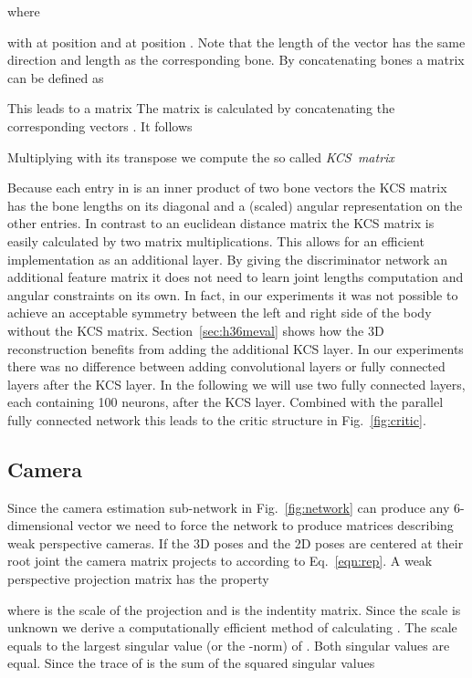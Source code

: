 \documentclass[10pt,twocolumn,letterpaper]{article}
\begin{document}
where

with  at position  and  at position . 
Note that the length of the vector  has the same direction and length as the corresponding bone. 
By concatenating  bones a matrix  can be defined as

This leads to a matrix  
The matrix  is calculated by concatenating the corresponding vectors .
It follows

Multiplying  with its transpose we compute the so called \textit{KCS~matrix}

Because each entry in  is an inner product of two bone vectors the KCS matrix has the bone lengths on its diagonal and a (scaled) angular representation on the other entries.
In contrast to an euclidean distance matrix \cite{Moreno_cvpr2017} the KCS matrix  is easily calculated by two matrix multiplications.
This allows for an efficient implementation as an additional layer.
By giving the discriminator network an additional feature matrix it does not need to learn joint lengths computation and angular constraints on its own.
In fact, in our experiments it was not possible to achieve an acceptable symmetry between the left and right side of the body without the KCS matrix.
Section~\ref{sec:h36meval} shows how the 3D reconstruction benefits from adding the additional KCS layer.
In our experiments there was no difference between adding convolutional layers or fully connected layers after the KCS layer.
In the following we will use two fully connected layers, each containing 100 neurons, after the KCS layer.
Combined with the parallel fully connected network this leads to the critic structure in Fig.~\ref{fig:critic}.

\subsection{Camera}
Since the camera estimation sub-network in Fig.~\ref{fig:network} can produce any 6-dimensional vector we need to force the network to produce matrices describing weak perspective cameras. 
If the 3D poses and the 2D poses are centered at their root joint the camera matrix  projects  to  according to Eq.~\ref{eqn:rep}. 
A weak perspective projection matrix  has the property 

where  is the scale of the projection and  is the  indentity matrix. 
Since the scale  is unknown we derive a computationally efficient method of calculating .
The scale  equals to the largest singular value (or the -norm) of .
Both singular values are equal.
Since the trace of  is the sum of the squared singular values
\end{document}
